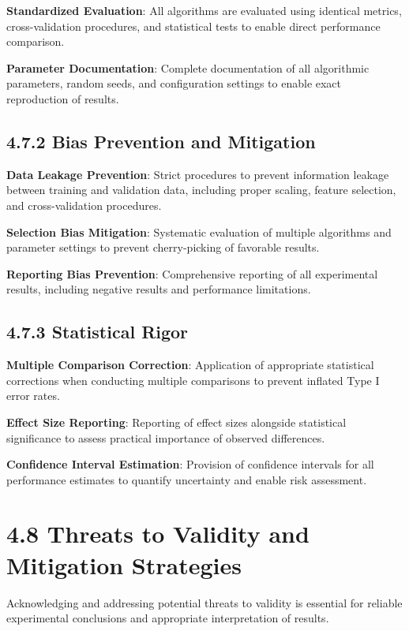 \documentclass[
  12pt,
  a4paper,
]{report}
\begin{document}
\textbf{Standardized Evaluation}: All algorithms are evaluated using
identical metrics, cross-validation procedures, and statistical tests to
enable direct performance comparison.

\textbf{Parameter Documentation}: Complete documentation of all
algorithmic parameters, random seeds, and configuration settings to
enable exact reproduction of results.

\subsection{4.7.2 Bias Prevention and
Mitigation}\label{bias-prevention-and-mitigation}

\textbf{Data Leakage Prevention}: Strict procedures to prevent
information leakage between training and validation data, including
proper scaling, feature selection, and cross-validation procedures.

\textbf{Selection Bias Mitigation}: Systematic evaluation of multiple
algorithms and parameter settings to prevent cherry-picking of favorable
results.

\textbf{Reporting Bias Prevention}: Comprehensive reporting of all
experimental results, including negative results and performance
limitations.

\subsection{4.7.3 Statistical Rigor}\label{statistical-rigor}

\textbf{Multiple Comparison Correction}: Application of appropriate
statistical corrections when conducting multiple comparisons to prevent
inflated Type I error rates.

\textbf{Effect Size Reporting}: Reporting of effect sizes alongside
statistical significance to assess practical importance of observed
differences.

\textbf{Confidence Interval Estimation}: Provision of confidence
intervals for all performance estimates to quantify uncertainty and
enable risk assessment.

\section{4.8 Threats to Validity and Mitigation
Strategies}\label{threats-to-validity-and-mitigation-strategies}

Acknowledging and addressing potential threats to validity is essential
for reliable experimental conclusions and appropriate interpretation of
results.
\end{document}
